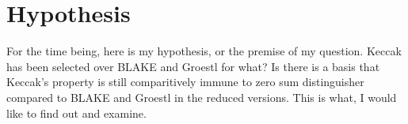 \chapter{Hypothesis}




For the time being, here is my hypothesis, or the premise of my question. Keccak has been selected over BLAKE and
Groestl for what? Is there is a basis that Keccak's property is still comparitively immune to zero sum distinguisher
compared to BLAKE and Groestl in the reduced versions. This is what, I would like to find out and examine.
